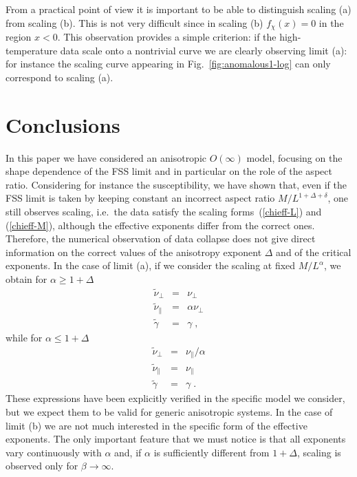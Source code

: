 \documentclass[a4paper,12pt]{article}
\begin{document}
From a practical point of view it is important to be able to distinguish 
scaling (a) from scaling (b). This is not very difficult since in scaling 
(b) $f_\chi(x)=0$ in the region $x<0$. This observation provides a simple 
criterion: if the high-temperature data scale onto a nontrivial curve 
we are clearly observing limit (a): for instance the scaling curve 
appearing in Fig.~\ref{fig:anomalous1-log} can only correspond to scaling
(a).

\section{Conclusions} \label{sec6}

In this paper we have considered an anisotropic $O(\infty)$ model,
focusing on the shape dependence of the FSS limit and in particular
on the role of the aspect ratio. Considering for instance the susceptibility,
we have shown that, even if the FSS limit is taken by keeping constant
an incorrect aspect ratio $M/L^{1+\Delta+\delta}$, one still observes scaling, 
i.e.~the
data satisfy the scaling forms~(\ref{chieff-L}) and (\ref{chieff-M}), 
although the effective exponents differ from the correct ones. Therefore, the 
numerical observation of data collapse does not give direct 
information on the correct values of the anisotropy exponent $\Delta$ 
and of the critical exponents. 
In the case of limit (a), if we consider the scaling at fixed 
$M/L^\alpha$, we obtain for $\alpha \ge 1 + \Delta$
\begin{eqnarray}
\tilde{\nu}_\bot &=& \nu_\bot  \nonumber \\
\tilde{\nu}_\|   &=& \alpha\nu_\bot   \nonumber \\
\tilde{\gamma}   &=&  \gamma \; ,
\label{limita-1}
\end{eqnarray}
while for $\alpha \le 1 + \Delta$
\begin{eqnarray}
\tilde{\nu}_\bot &=& \nu_\|/\alpha  \nonumber \\
\tilde{\nu}_\|   &=& \nu_\|   \nonumber \\
\tilde{\gamma}   &=&  \gamma \; .
\label{limita-2}
\end{eqnarray}
These expressions have been explicitly verified in the specific model we 
consider, 
but we expect them to be valid for generic anisotropic systems.
In the case of limit (b) we are not much interested in the specific form
of the effective exponents. The only important feature that we must notice 
is that all exponents vary continuously with $\alpha$ and, if $\alpha$ is 
sufficiently different from $1 + \Delta$, scaling is observed only for 
$\beta\to \infty$.
                     
\end{document}
